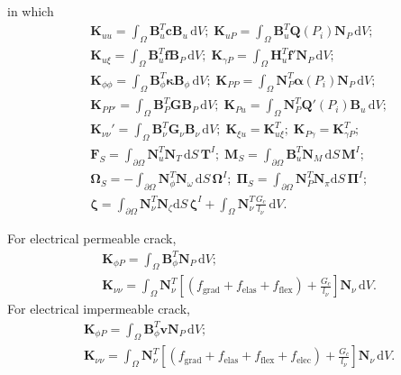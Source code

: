 in which 
\begin{equation}
    \begin{split}
        & \mathbf{K}_{uu}=\int_\Omega \mathbf{B}_u^T{\mathbf{c}}\mathbf{B}_u\,\mathrm{d}V;\;  
        \mathbf{K}_{uP}=\int_\Omega \mathbf{B}_u^T{\mathbf{Q}(P_i)}\mathbf{N}_P\,\mathrm{d}V; \; \\
        & \mathbf{K}_{u\xi}=\int_\Omega \mathbf{B}_u^T{\mathbf{f}}\mathbf{B}_P\,\mathrm{d}V;\;
        \mathbf{K}_{\gamma P}=\int_\Omega \mathbf{H}_u^T{\mathbf{f'}}\mathbf{N}_P\,\mathrm{d}V; \\
        &\mathbf{K}_{\phi\phi}=\int_\Omega \mathbf{B}_\phi^T{\mathbf{\kappa}}\mathbf{B}_\phi\,\mathrm{d}V; \;
        \mathbf{K}_{PP}=\int_\Omega \mathbf{N}_P^T\mathbf{\alpha}(P_i)\mathbf{N}_P\,\mathrm{d}V; \; \\
        &\mathbf{K}_{PP'}=\int_\Omega \mathbf{B}_P^T{\mathbf{G}}\mathbf{B}_P\,\mathrm{d}V; \; \mathbf{K}_{Pu}=\int_\Omega \mathbf{N}_P^T{\mathbf{Q}'(P_i)}\mathbf{B}_u\, \mathrm{d}V; \\
        &\mathbf{K}_{\nu\nu}'=\int_\Omega \mathbf{B}_\nu^T \mathbf{G}_\nu \mathbf{B}_\nu\, \text{d}V; \;
        \mathbf{K}_{\xi u}=\mathbf{K}_{u\xi}^T;\;
        \mathbf{K}_{P\gamma}=\mathbf{K}_{\gamma P}^T;\; 
         \\
        &\mathbf{F}_S=\int_{\partial \Omega} \mathbf{N}_u^T\mathbf{N}_T\,\mathrm{d}S \, \mathbf{T}^I; \;
        \mathbf{M}_S=\int_{\partial \Omega} \mathbf{B}_u^T\mathbf{N}_M\,\mathrm{d}S \, \mathbf{M}^I; \\
        & \mathbf{\Omega}_S=-\int_{\partial \Omega} \mathbf{N}_\phi^T\mathbf{N}_\omega\,\mathrm{d}S \, \mathbf{\Omega}^I;\; 
        \mathbf{\Pi}_S=\int_{\partial \Omega} \mathbf{N}_P^T\mathbf{N}_\pi \mathrm{d}S \,\mathbf{\Pi}^I; \\
        &\mathbf{\zeta}=\int_{\partial \Omega} \mathbf{N}_\nu^T \mathbf{N}_\zeta\mathrm{d}S\, \mathbf{\zeta}^I+\int_\Omega \mathbf{N}_\nu^T\frac{G_c}{l_\nu}\,\text{d}V.
    \end{split}
\end{equation}

For electrical permeable crack,
\begin{equation}
    \begin{split}
        & \mathbf{K}_{\phi P}=\int_\Omega \mathbf{B}_\phi^T\mathbf{N}_P\,\mathrm{d}V; \\
        &\mathbf{K}_{\nu\nu}=\int_\Omega \mathbf{N}_\nu^T \left[(f_\mathrm{grad}+f_\mathrm{elas}+f_\mathrm{flex})+\frac{G_c}{l_\nu}\right]\mathbf{N}_\nu \,\mathrm{d}V.
    \end{split}
\end{equation}
For electrical impermeable crack, 
\begin{equation}
    \begin{split}
        &\mathbf{K}_{\phi P}=\int_\Omega \mathbf{B}_\phi^T{\mathbf{v}}\mathbf{N}_P\,\mathrm{d}V; \\
        &\mathbf{K}_{\nu\nu}=\int_\Omega \mathbf{N}_\nu^T \left[(f_\mathrm{grad}+f_\mathrm{elas}+f_\mathrm{flex}+f_\mathrm{elec})+\frac{G_c}{l_\nu}\right]\mathbf{N}_\nu \,\mathrm{d}V .
    \end{split}
\end{equation}

